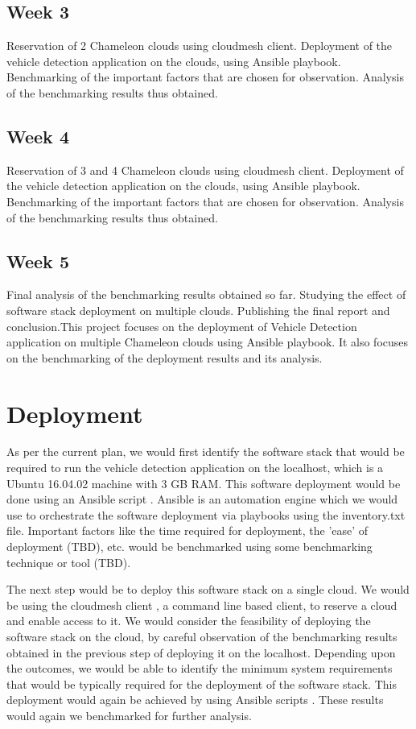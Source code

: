 \documentclass[9pt,twocolumn,twoside]{../../styles/osajnl}
\begin{document}
\subsection{Week 3}
Reservation of 2 Chameleon clouds using cloudmesh client.  Deployment
of the vehicle detection application on the clouds, using Ansible
playbook.  Benchmarking of the important factors that are chosen for
observation.  Analysis of the benchmarking results thus obtained.

\subsection{Week 4}
Reservation of 3 and 4 Chameleon clouds using cloudmesh client.
Deployment of the vehicle detection application on the clouds, using
Ansible playbook.  Benchmarking of the important factors that are
chosen for observation.  Analysis of the benchmarking results thus
obtained.

\subsection{Week 5}
Final analysis of the benchmarking results obtained so far.  Studying
the effect of software stack deployment on multiple clouds.
Publishing the final report and conclusion.This project focuses on the
deployment of Vehicle Detection application on multiple Chameleon
clouds using Ansible playbook.  It also focuses on the benchmarking of
the deployment results and its analysis.

\section{Deployment}

As per the current plan, we would first identify the software stack
that would be required to run the vehicle detection application on the
localhost, which is a Ubuntu 16.04.02 machine with 3 GB RAM.  This
software deployment would be done using an Ansible script
\cite{Ansible}.  Ansible is an automation engine which we would use to
orchestrate the software deployment via playbooks using the
inventory.txt file.  Important factors like the time required for
deployment, the 'ease' of deployment (TBD), etc. would be benchmarked
using some benchmarking technique or tool (TBD).

The next step would be to deploy this software stack on a single
cloud.  We would be using the cloudmesh client
\cite{github-cloudmesh-client}, a command line based client, to
reserve a cloud and enable access to it.  We would consider the
feasibility of deploying the software stack on the cloud, by careful
observation of the benchmarking results obtained in the previous step
of deploying it on the localhost.  Depending upon the outcomes, we
would be able to identify the minimum system requirements that would
be typically required for the deployment of the software stack.  This
deployment would again be achieved by using Ansible
scripts \cite{Ansible}.  These results would again we benchmarked for
further analysis.
	
\end{document}
